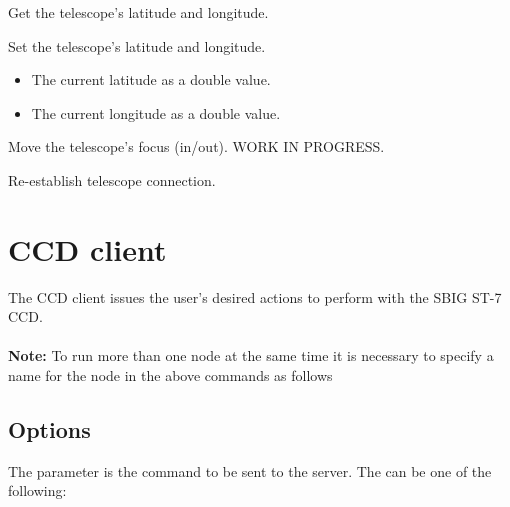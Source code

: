 \documentclass[a4paper,english]{article}
\begin{document}
\begin{Description}
\item[\Arg{getlatlon}] Get the telescope's latitude and longitude.

	   
	
\item[\Arg{setlatlon}] Set the telescope's latitude and longitude.

	     
	
	\begin{itemize}
		\item {} The current latitude as a double value.
		\item {} The current longitude as a double value.
	\end{itemize}
	
\item[\Arg{focus}] Move the telescope's focus (in/out). WORK IN PROGRESS.

\item[\Arg{reconnect}] Re-establish telescope connection.

	   
	
\end{Description}


\section{CCD client}

The CCD client issues the user's desired actions to perform with the SBIG ST-7 CCD. \\

     \\

\textbf{Note:} To run more than one  node at the same time it is necessary to specify a name for the node in the above commands as follows 


\subsection{Options}

The  parameter is the command to be sent to the server. The  can be one of the following:
\end{document}
